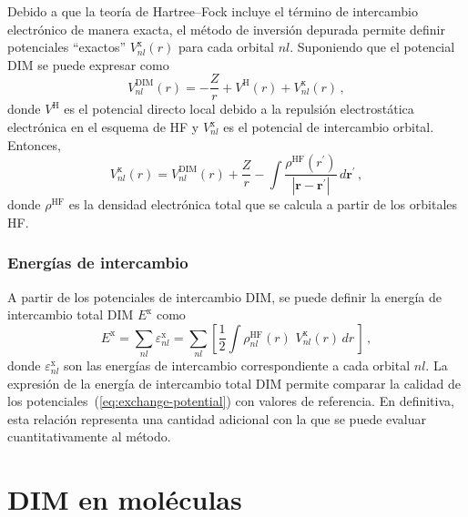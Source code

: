 Debido a que la teoría de Hartree--Fock incluye el término de 
intercambio electrónico de manera exacta, el método de inversión 
depurada permite definir potenciales ``exactos'' 
$V_{nl}^{\mathrm{x}}(r)$ para cada orbital $nl$. Suponiendo que el 
potencial DIM se puede expresar como
\begin{equation}
V_{nl}^{\mathrm{DIM}}(r) = -\frac{Z}{r} + V^{\mathrm{H}}(r) 
+ V_{nl}^{\mathrm{x}}(r) \, , 
\label{eq:VDIM}
\end{equation}
donde $V^{\mathrm{H}}$ es el potencial directo local debido a la 
repulsión electrostática electrónica en el esquema de HF y 
$V_{nl}^{\mathrm{x}}$ es el potencial de intercambio orbital. Entonces,
\begin{equation}
V_{nl}^{\mathrm{x}}(r)=V_{nl}^{\mathrm{DIM}}(r)+\frac{Z}{r}
-\int{ \frac{\rho^{\mathrm{HF}}(r^{\prime})  }
{\left| \mathbf{r} - \mathbf{r^{\prime}} \right|}} \, 
d \mathbf{r^{\prime}} \, ,
\label{eq:exchange-potential}
\end{equation}
donde $\rho^{\mathrm{HF}}$ es la densidad electrónica total que se
calcula a partir de los orbitales HF.

\subsubsection*{Energías de intercambio}

A partir de los potenciales de intercambio DIM, se puede definir la 
energía de intercambio total DIM $E^{\mathrm{x}}$ como
\begin{equation}
E^{\mathrm{x}} = \sum_{nl}\varepsilon_{nl}^{\mathrm{x}} = 
\sum_{nl}\left[\frac{1}{2}\int{\rho^{\mathrm{HF}}_{nl}(r) \, \, 
V_{nl}^{\mathrm{x}}}(r) \, dr \, \right]\,,
\label{eq:exchange-energy}
\end{equation}
donde $\varepsilon_{nl}^{\mathrm{x}}$ son las energías de intercambio 
correspondiente a cada orbital $nl$. La expresión de la energía de 
intercambio total DIM permite comparar la calidad de los 
potenciales~(\ref{eq:exchange-potential}) con valores de referencia. 
En definitiva, esta relación representa una cantidad adicional con la 
que se puede evaluar cuantitativamente al método.

\section{DIM en moléculas}
\label{sec:dimmoleculas}


